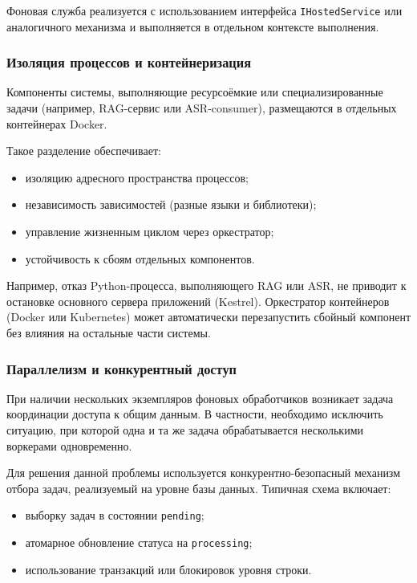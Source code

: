 \documentclass{article}
\begin{document}
Фоновая служба реализуется с использованием интерфейса \texttt{IHostedService} или аналогичного механизма и выполняется в отдельном контексте выполнения.

\subsubsection{Изоляция процессов и контейнеризация}

Компоненты системы, выполняющие ресурсоёмкие или специализированные задачи (например, RAG-сервис или ASR-consumer), размещаются в отдельных контейнерах Docker.

Такое разделение обеспечивает:
\begin{itemize}
\item изоляцию адресного пространства процессов;
\item независимость зависимостей (разные языки и библиотеки);
\item управление жизненным циклом через оркестратор;
\item устойчивость к сбоям отдельных компонентов.
\end{itemize}

Например, отказ Python-процесса, выполняющего RAG или ASR, не приводит к остановке основного сервера приложений (Kestrel). Оркестратор контейнеров (Docker или Kubernetes) может автоматически перезапустить сбойный компонент без влияния на остальные части системы.

\subsubsection{Параллелизм и конкурентный доступ}

При наличии нескольких экземпляров фоновых обработчиков возникает задача координации доступа к общим данным. В частности, необходимо исключить ситуацию, при которой одна и та же задача обрабатывается несколькими воркерами одновременно.

Для решения данной проблемы используется конкурентно-безопасный механизм отбора задач, реализуемый на уровне базы данных. Типичная схема включает:
\begin{itemize}
\item выборку задач в состоянии \texttt{pending};
\item атомарное обновление статуса на \texttt{processing};
\item использование транзакций или блокировок уровня строки.
\end{itemize}
\end{document}

